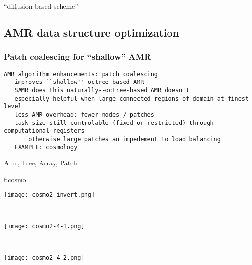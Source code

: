 \documentclass[14pt,letter]{article}
\begin{document}
``diffusion-based scheme''

\subsection{AMR data structure optimization} \label{ss:amr-optimizations}

\subsubsection{Patch coalescing  for ``shallow'' AMR} \label{sss:patch-coalescing}

\begin{verbatim}
AMR algorithm enhancements: patch coalescing
   improves ``shallow'' octree-based AMR
   SAMR does this naturally--octree-based AMR doesn't
   especially helpful when large connected regions of domain at finest level
   less AMR overhead: fewer nodes / patches
   task size still controlable (fixed or restricted) through computational registers
       otherwise large patches an impedement to load balancing
   EXAMPLE: cosmology
\end{verbatim}

Amr, Tree, Array, Patch




{f:cosmo}{
\begin{minipage}{7.0in}
\begin{minipage}{2.2in}
\texttt{[image: cosmo2-invert.png]}
\end{minipage} \ 
\begin{minipage}{2.2in}
\texttt{[image: cosmo2-4-1.png]}
\end{minipage} \ 
\begin{minipage}{2.2in}
\texttt{[image: cosmo2-4-2.png]}
\end{minipage}
\end{minipage}
}
\end{document}
